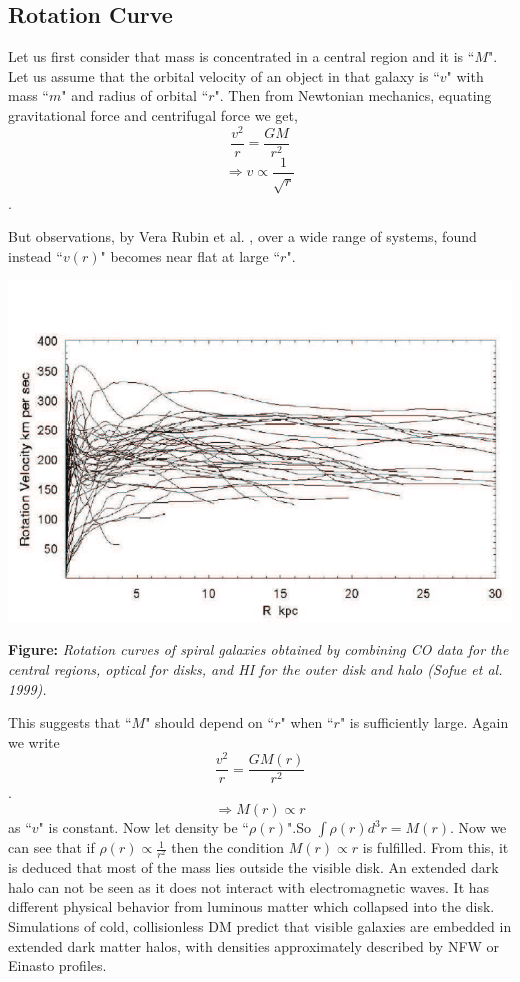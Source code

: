 \documentclass[12pt]{report}
\begin{document}
\subsection{Rotation Curve}


Let us first consider that mass is concentrated in a central region and it is ``$M$". Let us assume that the orbital velocity of an object in that galaxy is ``$v$" with mass ``$m$" and radius of orbital ``$r$". Then from Newtonian mechanics, equating gravitational force and centrifugal force we get, $$\frac{v^2}{r}=\frac{GM}{r^2}$$ $$\Rightarrow v\propto \frac{1}{\sqrt{r}}$$.

But observations, by Vera Rubin et al.\cite{rcurve} , over a wide range of systems, found instead ``$v(r)$" becomes near flat at large ``$r$".\\



\begin{center}

\includegraphics[scale=0.5]{rcurve.png}


\textbf{Figure:} \textit{ Rotation curves of spiral galaxies obtained by combining CO data for
the central regions, optical for disks, and HI for the outer disk and halo (Sofue et
al. 1999).} \cite{rcurve}
\end{center}

This suggests that ``$M$" should depend on ``$r$" when ``$r$" is sufficiently large\cite{rcurve}. Again we write $$\frac{v^2}{r}=\frac{GM(r)}{r^2}$$. $$\Rightarrow M(r)\propto r$$ as ``$v$" is constant. Now let density be ``$\rho(r)$".So $\int\rho(r)d^3r=M(r)$. Now we can see that if $\rho(r)\propto \frac{1}{r^2}$ then the condition $M(r)\propto r$ is fulfilled. From this, it is deduced that most of the mass lies outside the visible disk. An extended dark halo can not be seen as it does not interact with electromagnetic waves. It has different physical behavior from luminous matter which collapsed into the disk. Simulations of cold, collisionless DM predict that visible galaxies are embedded in extended dark matter halos, with densities approximately described by NFW or Einasto profiles.\\
\end{document}
